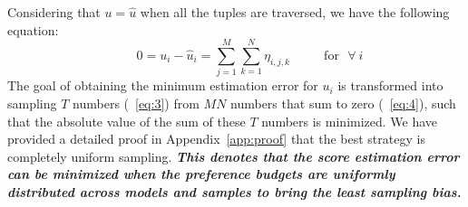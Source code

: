 Considering that $u=\hat{u}$ when all the tuples are traversed, we have the following equation:
\begin{equation}
    \ \ \ \ \ \ \ \ \ \ 0 = u_i-\hat{u}_i = \sum_{j=1}^M\sum_{k=1}^N \eta_{i,j,k} \ \ \ \ \ \ \ \ \ \ \ \ \text{for} \ \ \ \forall \  i
    \label{eq:4}
\end{equation}
The goal of obtaining the minimum estimation error for $u_i$ is transformed into sampling \( T \) numbers (~\eqref{eq:3}) from \( MN \) numbers that sum to zero (~\eqref{eq:4}), such that the absolute value of the sum of these \( T \) numbers is minimized. We have provided a detailed proof in Appendix~\ref{app:proof} that the best strategy is completely uniform sampling. \textit{\textbf{This denotes that the score estimation error can be minimized when the preference budgets are uniformly distributed across models and samples to bring the least sampling bias.}}

